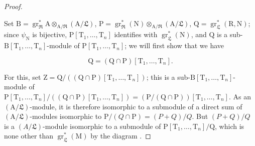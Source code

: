 \begin{proof}
\begin{env}[19.7.1.2]
\label{IV.19.7.1.2}
Set $\mathrm{B}=\operatorname{gr}_\mathfrak{R}^*\mathrm{A}\otimes_{\mathrm{A}/\mathfrak{R}}(\mathrm{A}/\mathfrak{L})$, $\mathrm{P}=\operatorname{gr}_\mathfrak{R}^*(\mathrm{N})\otimes_{\mathrm{A}/\mathfrak{R}}(\mathrm{A}/\mathfrak{L})$, $\mathrm{Q}=\operatorname{gr}_\mathfrak{L}^*(\mathrm{R},\mathrm{N})$; since $\psi_\mathrm{N}$ is bijective, $\mathrm{P}[\mathrm{T}_1,\ldots,\mathrm{T}_n]$ identifies with $\operatorname{gr}_\mathfrak{L}^*(\mathrm{N})$, and $\mathrm{Q}$ is a sub-$\mathrm{B}[\mathrm{T}_1,\ldots,\mathrm{T}_n]$-module of $\mathrm{P}[\mathrm{T}_1,\ldots,\mathrm{T}_n]$; we will first show that we have
\end{env}
\begin{env}[19.7.1.3]
\label{IV.19.7.1.3}
\[
  \mathrm{Q}=(\mathrm{Q}\cap\mathrm{P})[\mathrm{T}_1,\ldots,\mathrm{T}_n].
\]
\end{env}

For this, set $\mathrm{Z}=\mathrm{Q}/((\mathrm{Q}\cap\mathrm{P})[\mathrm{T}_1,\ldots,\mathrm{T}_n])$; this is a sub-$\mathrm{B}[\mathrm{T}_1,\ldots,\mathrm{T}_n]$-module of $\mathrm{P}[\mathrm{T}_1,\ldots,\mathrm{T}_n]/((\mathrm{Q}\cap\mathrm{P})[\mathrm{T}_1,\ldots,\mathrm{T}_n])=(\mathrm{P}/(\mathrm{Q}\cap\mathrm{P}))[\mathrm{T}_1,\ldots,\mathrm{T}_n]$. As an $(\mathrm{A}/\mathfrak{L})$-module, it is therefore isomorphic to a submodule of a direct sum of $(\mathrm{A}/\mathfrak{L})$-modules isomorphic to $\mathrm{P}/(Q\cap\mathrm{P})=(P+Q)/Q$. But $(P+Q)/Q$ is a $(A/\mathfrak{L})$-module isomorphic to a submodule of $\mathrm{P}[\mathrm{T}_1,\ldots,\mathrm{T}_n]/\mathrm{Q}$, which is none other than $\operatorname{gr}_\mathfrak{L}^*(\mathrm{M})$ by the diagram .


\end{proof}
